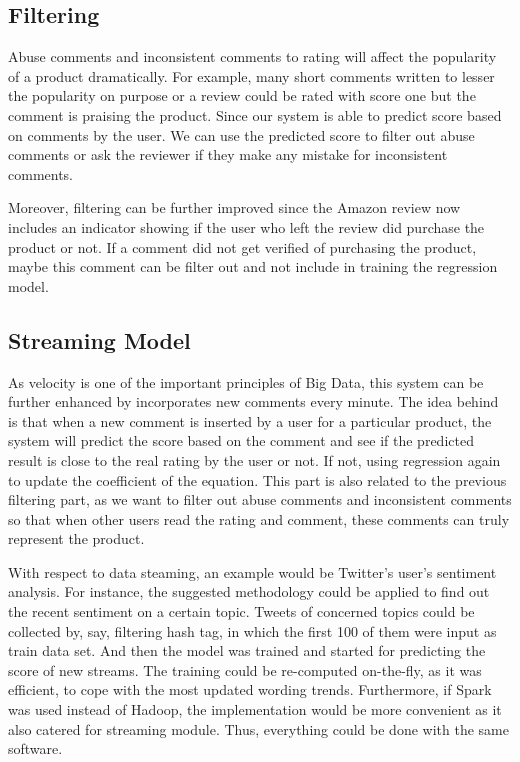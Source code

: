 \subsection{Filtering}
Abuse comments and inconsistent comments to rating will affect the popularity of a product dramatically. For example, many short comments written to lesser the popularity on purpose or a review could be rated with score one but the comment is praising the product. Since our system is able to predict score based on comments by the user. We can use the predicted score to filter out abuse comments or ask the reviewer if they make any mistake for inconsistent comments. 

Moreover, filtering can be further improved since the Amazon review now includes an indicator showing if the user who left the review did purchase the product or not. If a comment did not get verified of purchasing the product, maybe this comment can be filter out and not include in training the regression model.

\subsection{Streaming Model}
As velocity is one of the important principles of Big Data, this system can be further enhanced by incorporates new comments every minute. The idea behind is that when a new comment is inserted by a user for a particular product, the system will predict the score based on the comment and see if the predicted result is close to the real rating by the user or not. If not, using regression again to update the coefficient of the equation. This part is also related to the previous filtering part, as we want to filter out abuse comments and inconsistent comments so that when other users read the rating and comment, these comments can truly represent the product.

With respect to data steaming, an example would be Twitter's user's sentiment analysis. For instance, the suggested methodology could be applied to find out the recent sentiment on a certain topic. Tweets of concerned topics could be collected by, say, filtering hash tag, in which the first 100 of them were input as train data set. And then the model was trained and started for predicting the score of new streams. The training could be re-computed on-the-fly, as it was efficient, to cope with the most updated wording trends. Furthermore, if Spark was used instead of Hadoop, the implementation would be more convenient as it also catered for streaming module. Thus, everything could be done with the same software.



